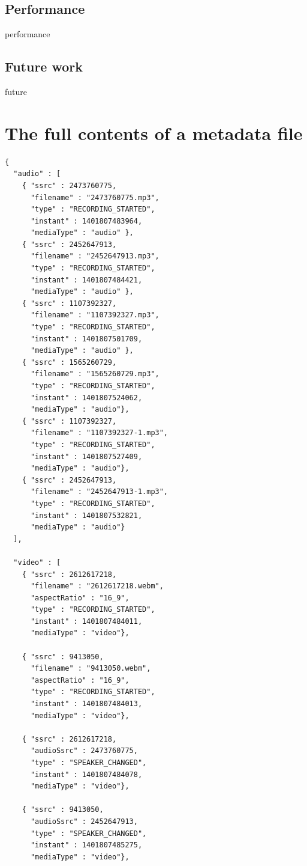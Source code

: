 \documentclass[twoside,openright,a4paper,12pt,english]{article}
\begin{document}
\subsection{Performance}
performance


\subsection{Future work}
future





\section{The full contents of a metadata file}
\label{appendix-metadata}
\begin{verbatim}
{
  "audio" : [
    { "ssrc" : 2473760775,
      "filename" : "2473760775.mp3",
      "type" : "RECORDING_STARTED",
      "instant" : 1401807483964,
      "mediaType" : "audio" },
    { "ssrc" : 2452647913,
      "filename" : "2452647913.mp3",
      "type" : "RECORDING_STARTED",
      "instant" : 1401807484421,
      "mediaType" : "audio" },
    { "ssrc" : 1107392327,
      "filename" : "1107392327.mp3",
      "type" : "RECORDING_STARTED",
      "instant" : 1401807501709,
      "mediaType" : "audio" },
    { "ssrc" : 1565260729,
      "filename" : "1565260729.mp3",
      "type" : "RECORDING_STARTED",
      "instant" : 1401807524062,
      "mediaType" : "audio"},
    { "ssrc" : 1107392327,
      "filename" : "1107392327-1.mp3",
      "type" : "RECORDING_STARTED",
      "instant" : 1401807527409,
      "mediaType" : "audio"},
    { "ssrc" : 2452647913,
      "filename" : "2452647913-1.mp3",
      "type" : "RECORDING_STARTED",
      "instant" : 1401807532821,
      "mediaType" : "audio"}
  ],

  "video" : [
    { "ssrc" : 2612617218,
      "filename" : "2612617218.webm",
      "aspectRatio" : "16_9",
      "type" : "RECORDING_STARTED",
      "instant" : 1401807484011,
      "mediaType" : "video"},
      
    { "ssrc" : 9413050,
      "filename" : "9413050.webm",
      "aspectRatio" : "16_9",
      "type" : "RECORDING_STARTED",
      "instant" : 1401807484013,
      "mediaType" : "video"},
      
    { "ssrc" : 2612617218,
      "audioSsrc" : 2473760775,
      "type" : "SPEAKER_CHANGED",
      "instant" : 1401807484078,
      "mediaType" : "video"},
      
    { "ssrc" : 9413050,
      "audioSsrc" : 2452647913,
      "type" : "SPEAKER_CHANGED",
      "instant" : 1401807485275,
      "mediaType" : "video"},
      

\end{verbatim}
\end{document}

